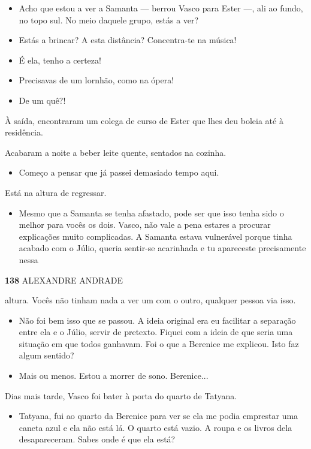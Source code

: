 \begin{itemize}
\tightlist
\item
  Acho que estou a ver a Samanta --- berrou Vasco para Ester ---, ali ao
  fundo, no topo sul. No meio daquele grupo, estás a ver?
\item
  Estás a brincar? A esta distância? Concentra-te na música!
\item
  É ela, tenho a certeza!
\item
  Precisavas de um lornhão, como na ópera!
\item
  De um quê?!
\end{itemize}

À saída, encontraram um colega de curso de Ester que lhes deu boleia até
à residência.

Acabaram a noite a beber leite quente, sentados na cozinha.

\begin{itemize}
\tightlist
\item
  Começo a pensar que já passei demasiado tempo aqui.
\end{itemize}

Está na altura de regressar.

\begin{itemize}
\tightlist
\item
  Mesmo que a Samanta se tenha afastado, pode ser que isso tenha sido o
  melhor para vocês os dois. Vasco, não vale a pena estares a procurar
  explicações muito complicadas. A Samanta estava vulnerável porque
  tinha acabado com o Júlio, queria sentir-se acarinhada e tu apareceste
  precisamente nessa
\end{itemize}

\textbf{138 }ALEXANDRE ANDRADE

altura. Vocês não tinham nada a ver um com o outro, qualquer pessoa via
isso.

\begin{itemize}
\tightlist
\item
  Não foi bem isso que se passou. A ideia original era eu facilitar a
  separação entre ela e o Júlio, servir de pretexto. Fiquei com a ideia
  de que seria uma situação em que todos ganhavam. Foi o que a Berenice
  me explicou. Isto faz algum sentido?
\item
  Mais ou menos. Estou a morrer de sono. Berenice...
\end{itemize}

Dias mais tarde, Vasco foi bater à porta do quarto de Tatyana.

\begin{itemize}
\tightlist
\item
  Tatyana, fui ao quarto da Berenice para ver se ela me podia emprestar
  uma caneta azul e ela não está lá. O quarto está vazio. A roupa e os
  livros dela desapareceram. Sabes onde é que ela está?
\end{itemize}

